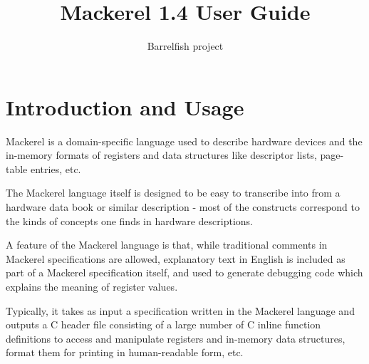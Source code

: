 \documentclass[a4paper,11pt,twoside]{report}
\title{Mackerel 1.4 User Guide}
\author{Barrelfish project}
\begin{document}
\maketitle			%

\begin{versionhistory}
\end{versionhistory}

\tableofcontents		%
\cleardoublepage
\setcounter{secnumdepth}{2}

\newcommand{\fnname}[1]{\textit{\texttt{#1}}}%
\newcommand{\datatype}[1]{\textit{\texttt{#1}}}%
\newcommand{\varname}[1]{\texttt{#1}}%
\newcommand{\keywname}[1]{\textbf{\texttt{#1}}}%
\newcommand{\tabindent}{\hspace*{3ex}}%
\newcommand{\Mac}{Mackerel\xspace}




\chapter{Introduction and Usage} 

\Mac is a domain-specific language used to describe hardware devices
and the in-memory formats of registers and data structures like
descriptor lists, page-table entries, etc.   

The \Mac language itself is designed to be easy to transcribe into
from a hardware data book or similar description - most of the
constructs correspond to the kinds of concepts one finds in hardware
descriptions. 

A feature of the \Mac language is that, while traditional comments in
\Mac specifications are allowed, explanatory text in English is
included as part of a \Mac specification itself, and used to generate
debugging code which explains the meaning of register values. 

 Typically, it takes as input a specification written in the
Mackerel language and outputs a C header file consisting of a large
number of C inline function definitions to access and manipulate
registers and in-memory data structures, format them for printing in
human-readable form, etc.  
\end{document}

